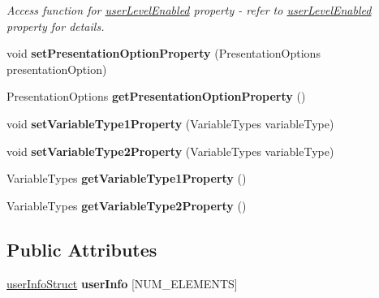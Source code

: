 \begin{DoxyCompactItemize}
\begin{DoxyCompactList}\small\item\em Access function for \hyperlink{classQEPeriodic_a0de902aca11667feca3158fa74be789f}{userLevelEnabled} property -\/ refer to \hyperlink{classQEPeriodic_a0de902aca11667feca3158fa74be789f}{userLevelEnabled} property for details. \end{DoxyCompactList}\item 
\hypertarget{classQEPeriodic_a3395a6e3f6195165c99000cf992eb95e}{
void {\bfseries setPresentationOptionProperty} (PresentationOptions presentationOption)}
\label{classQEPeriodic_a3395a6e3f6195165c99000cf992eb95e}

\item 
\hypertarget{classQEPeriodic_a5184e01f7a91b908e6ac3955eebc548e}{
PresentationOptions {\bfseries getPresentationOptionProperty} ()}
\label{classQEPeriodic_a5184e01f7a91b908e6ac3955eebc548e}

\item 
\hypertarget{classQEPeriodic_a5fea59b23b574e11cb32e12918f569ff}{
void {\bfseries setVariableType1Property} (VariableTypes variableType)}
\label{classQEPeriodic_a5fea59b23b574e11cb32e12918f569ff}

\item 
\hypertarget{classQEPeriodic_a65d8491c38884574bed98116cb4a502c}{
void {\bfseries setVariableType2Property} (VariableTypes variableType)}
\label{classQEPeriodic_a65d8491c38884574bed98116cb4a502c}

\item 
\hypertarget{classQEPeriodic_ac1f0ee039573b495f4ac2db8622b245e}{
VariableTypes {\bfseries getVariableType1Property} ()}
\label{classQEPeriodic_ac1f0ee039573b495f4ac2db8622b245e}

\item 
\hypertarget{classQEPeriodic_ad76de029ae8fde92ddf8c82e9165c5ca}{
VariableTypes {\bfseries getVariableType2Property} ()}
\label{classQEPeriodic_ad76de029ae8fde92ddf8c82e9165c5ca}

\end{DoxyCompactItemize}
\subsection*{Public Attributes}
\begin{DoxyCompactItemize}
\item 
\hypertarget{classQEPeriodic_a343a5241dbc877acc75f32ba02829ffa}{
\hyperlink{classuserInfoStruct}{userInfoStruct} {\bfseries userInfo} \mbox{[}NUM\_\-ELEMENTS\mbox{]}}
\label{classQEPeriodic_a343a5241dbc877acc75f32ba02829ffa}

\end{DoxyCompactItemize}
